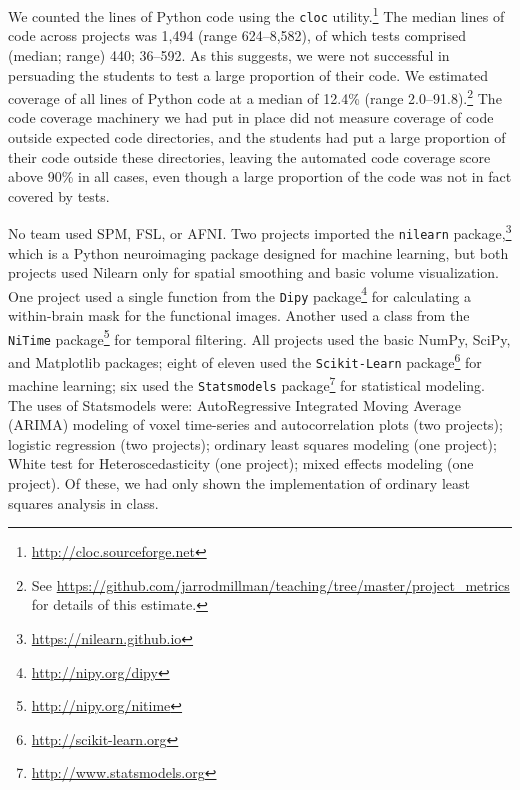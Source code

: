 We counted the lines of Python code using the \texttt{cloc}
utility.\footnote{\url{http://cloc.sourceforge.net}}  The median lines of code
across projects was 1,494 (range 624--8,582), of which tests comprised
(median; range) 440; 36--592.  As this suggests, we were not successful in
persuading the students to test a large proportion of their code.  We
estimated coverage of all lines of Python code at a median of 12.4\% (range
2.0--91.8).\footnote{See
\url{https://github.com/jarrodmillman/teaching/tree/master/project_metrics}
for details of this estimate.}  The code coverage machinery we had put in
place did not measure coverage of code outside expected code directories, and
the students had put a large proportion of their code outside these
directories, leaving the automated code coverage score above 90\% in all
cases, even though a large proportion of the code was not in fact covered by
tests.

No team used SPM, FSL, or AFNI.  Two projects imported the
\texttt{nilearn} package,\footnote{\url{https://nilearn.github.io}} which is a
Python neuroimaging package designed for machine learning, but both projects
used Nilearn only for spatial smoothing and basic volume visualization.  One
project used a single function from the
\texttt{Dipy} package\footnote{\url{http://nipy.org/dipy}} for calculating a
within-brain mask for the functional images.  Another used a class from the
\texttt{NiTime} package\footnote{\url{http://nipy.org/nitime}} for temporal
filtering.  All projects used the basic NumPy, SciPy, and Matplotlib packages;
eight of eleven used the \texttt{Scikit-Learn} package\footnote{\url{http://scikit-learn.org}}
for machine learning; six used the
\texttt{Statsmodels} package\footnote{\url{http://www.statsmodels.org}} for statistical
modeling.  The uses of Statsmodels
were: AutoRegressive Integrated Moving Average (ARIMA) modeling of voxel
time-series and autocorrelation plots (two projects); logistic regression (two
projects); ordinary least squares modeling (one project); White test for
Heteroscedasticity (one project); mixed effects modeling (one project).  Of
these, we had only shown the implementation of ordinary least squares analysis
in class.

